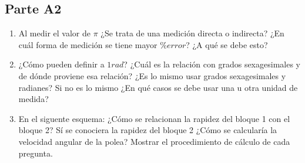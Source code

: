 \subsection{Parte A2}%
\label{sub:cues_parte_a2}

\begin{enumerate}
	\item Al medir el valor de $\pi$
		¿Se trata de una medición directa o indirecta?
		¿En cuál forma de medición se tiene mayor $\% error$?
		¿A qué se debe esto?
	\item ¿Cómo pueden definir a $1 rad$?
		¿Cuál es la relación con grados sexagesimales y de dónde proviene esa relación?
		¿Es lo mismo usar grados sexagesimales y radianes?
		Si no es lo mismo
		¿En qué casos se debe usar una u otra unidad de medida?
	\item En el siguente esquema:
		¿Cómo se relacionan la rapidez del bloque 1 con el bloque 2?
		Sí se conociera la rapidez del bloque 2
		¿Cómo se calcularía la velocidad angular de la polea?
		Mostrar el procedimiento de cálculo de cada pregunta.
\end{enumerate}
